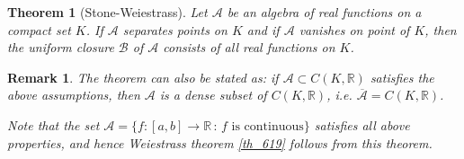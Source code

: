 \documentclass[11pt]{book}
\newtheorem{theorem}{Theorem}[chapter]
\newtheorem{remark}{Remark}[chapter]
\theoremstyle{definition}
\numberwithin{equation}{chapter}
\begin{document}
\begin{theorem}[Stone-Weiestrass]\label{th_623}
Let $\mathscr{A}$ be an algebra of real functions on a compact set $K$. If $\mathscr{A}$ separates points on $K$ and if $\mathscr{A}$ vanishes on point of $K$, then the uniform closure $\mathscr{B}$ of $\mathscr{A}$ consists of all real functions on $K$.
\end{theorem}
\begin{remark}
The theorem can also be stated as: if $\mathscr{A} \subset C(K,\mathbb{R})$ satisfies the above assumptions, then $\mathscr{A}$ is a dense subset of $C(K,\mathbb{R})$, i.e. $\overline{\mathscr{A}} = C(K,\mathbb{R})$.

Note that the set $\mathscr{A} = \{f: [a,b] \to \mathbb{R} \,:\, f \,\, \text{is continuous}\}$ satisfies all above properties, and hence Weiestrass theorem \ref{th_619} follows from this theorem.
\end{remark}
\end{document}
